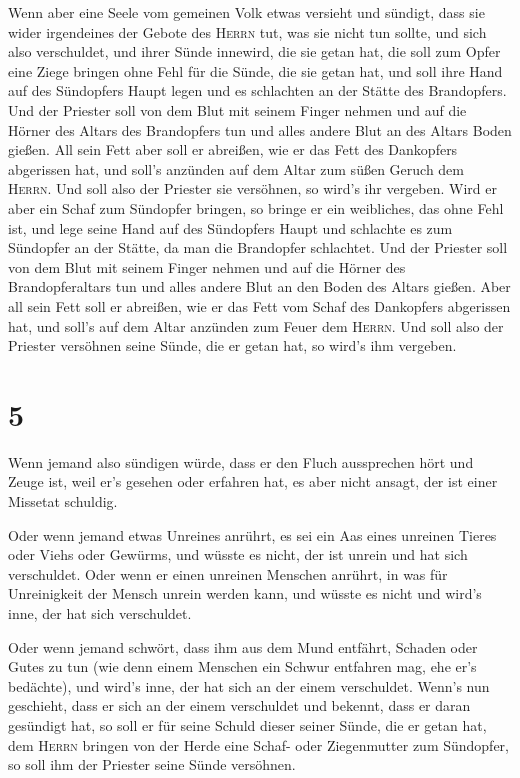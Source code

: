  Wenn aber eine Seele vom gemeinen Volk etwas versieht
und sündigt, dass sie wider irgendeines der Gebote des \textsc{Herrn}
tut, was sie nicht tun sollte, und sich also verschuldet,
 und ihrer Sünde innewird, die sie getan hat, die soll
zum Opfer eine Ziege bringen ohne Fehl für die Sünde, die sie getan hat,
 und soll ihre Hand auf des Sündopfers Haupt legen und es
schlachten an der Stätte des Brandopfers.  Und der
Priester soll von dem Blut mit seinem Finger nehmen und auf die Hörner
des Altars des Brandopfers tun und alles andere Blut an des Altars Boden
gießen.  All sein Fett aber soll er abreißen, wie er das
Fett des Dankopfers abgerissen hat, und soll's anzünden auf dem Altar
zum süßen Geruch dem \textsc{Herrn}. Und soll also der Priester sie
versöhnen, so wird's ihr vergeben.  Wird er aber ein
Schaf zum Sündopfer bringen, so bringe er ein weibliches, das ohne Fehl
ist,  und lege seine Hand auf des Sündopfers Haupt und
schlachte es zum Sündopfer an der Stätte, da man die Brandopfer
schlachtet.  Und der Priester soll von dem Blut mit
seinem Finger nehmen und auf die Hörner des Brandopferaltars tun und
alles andere Blut an den Boden des Altars gießen.  Aber
all sein Fett soll er abreißen, wie er das Fett vom Schaf des Dankopfers
abgerissen hat, und soll's auf dem Altar anzünden zum Feuer dem
\textsc{Herrn}. Und soll also der Priester versöhnen seine Sünde, die er
getan hat, so wird's ihm vergeben.

\hypertarget{section-4}{%
\section{5}\label{section-4}}

 Wenn jemand also sündigen würde, dass er den Fluch
aussprechen hört und Zeuge ist, weil er's gesehen oder erfahren hat, es
aber nicht ansagt, der ist einer Missetat schuldig.

 Oder wenn jemand etwas Unreines anrührt, es sei ein Aas
eines unreinen Tieres oder Viehs oder Gewürms, und wüsste es nicht, der
ist unrein und hat sich verschuldet.  Oder wenn er einen
unreinen Menschen anrührt, in was für Unreinigkeit der Mensch unrein
werden kann, und wüsste es nicht und wird's inne, der hat sich
verschuldet.

 Oder wenn jemand schwört, dass ihm aus dem Mund entfährt,
Schaden oder Gutes zu tun (wie denn einem Menschen ein Schwur entfahren
mag, ehe er's bedächte), und wird's inne, der hat sich an der einem
verschuldet.  Wenn's nun geschieht, dass er sich an der
einem verschuldet und bekennt, dass er daran gesündigt hat,
 so soll er für seine Schuld dieser seiner Sünde, die er
getan hat, dem \textsc{Herrn} bringen von der Herde eine Schaf- oder
Ziegenmutter zum Sündopfer, so soll ihm der Priester seine Sünde
versöhnen.

